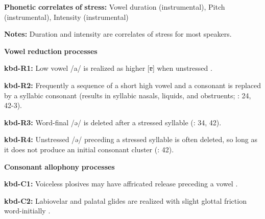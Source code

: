 \begin{styleBody}
\textbf{Phonetic} \textbf{correlates} \textbf{of} \textbf{stress:} Vowel duration (instrumental), Pitch (instrumental), Intensity (instrumental)
\end{styleBody}

\begin{styleBody}
\textbf{Notes:} Duration and intensity are correlates of stress for most speakers.
\end{styleBody}

\begin{styleBody}
\textbf{Vowel} \textbf{reduction} \textbf{processes}
\end{styleBody}

\begin{styleBody}
\textbf{kbd-R1:} Low vowel /a/ is realized as higher [ɐ] when unstressed \citep[98-9]{Applebaum2013}.
\end{styleBody}

\begin{styleBody}
\textbf{kbd-R2:} Frequently a sequence of a short high vowel and a consonant is replaced by a syllabic consonant (results in syllabic nasals, liquids, and obstruents; \citealt{Kuipers1960}: 24, 42-3).
\end{styleBody}

\begin{styleBody}
\textbf{kbd-R3:} Word-final /ə/ is deleted after a stressed syllable (\citealt{Kuipers1960}: 34, 42).
\end{styleBody}

\begin{styleBody}
\textbf{kbd-R4:} Unstressed /ə/ preceding a stressed syllable is often deleted, so long as it does not produce an initial consonant cluster (\citealt{GordonApplebaum2010}: 42).
\end{styleBody}

\begin{styleBody}
\textbf{Consonant} \textbf{allophony} \textbf{processes}
\end{styleBody}

\begin{styleBody}
\textbf{kbd-C1:} Voiceless plosives may have affricated release preceding a vowel \citep[17]{Kuipers1960}.
\end{styleBody}

\begin{styleBody}
\textbf{kbd-C2:} Labiovelar and palatal glides are realized with slight glottal friction word-initially \citep[22]{Kuipers1960}.
\end{styleBody}

